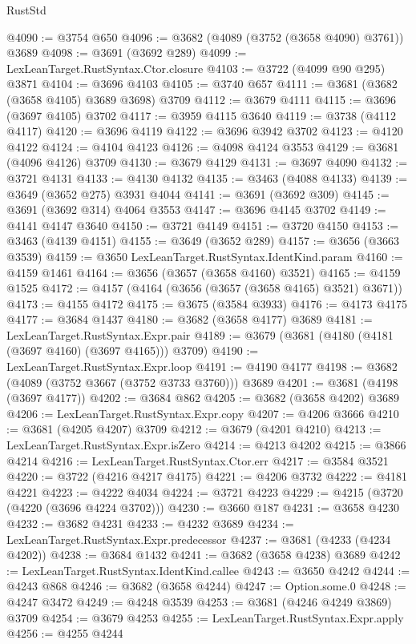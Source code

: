 \begin{lexlean}{RustStd}
\begin{coremodule}
@4090 := @3754 @650
@4096 := @3682 (@4089 (@3752 (@3658 @4090) @3761)) @3689
@4098 := @3691 (@3692 @289)
@4099 := LexLeanTarget.RustSyntax.Ctor.closure
@4103 := @3722 (@4099 @90 @295) @3871
@4104 := @3696 @4103
@4105 := @3740 @657
@4111 := @3681 (@3682 (@3658 @4105) @3689 @3698) @3709
@4112 := @3679 @4111
@4115 := @3696 (@3697 @4105) @3702
@4117 := @3959 @4115 @3640
@4119 := @3738 (@4112 @4117)
@4120 := @3696 @4119
@4122 := @3696 @3942 @3702
@4123 := @4120 @4122
@4124 := @4104 @4123
@4126 := @4098 @4124 @3553
@4129 := @3681 (@4096 @4126) @3709
@4130 := @3679 @4129
@4131 := @3697 @4090
@4132 := @3721 @4131
@4133 := @4130 @4132
@4135 := @3463 (@4088 @4133)
@4139 := @3649 (@3652 @275) @3931 @4044
@4141 := @3691 (@3692 @309)
@4145 := @3691 (@3692 @314) @4064 @3553
@4147 := @3696 @4145 @3702
@4149 := @4141 @4147 @3640
@4150 := @3721 @4149
@4151 := @3720 @4150
@4153 := @3463 (@4139 @4151)
@4155 := @3649 (@3652 @289)
@4157 := @3656 (@3663 @3539)
@4159 := @3650 LexLeanTarget.RustSyntax.IdentKind.param
@4160 := @4159 @1461
@4164 := @3656 (@3657 (@3658 @4160) @3521)
@4165 := @4159 @1525
@4172 := @4157 (@4164 (@3656 (@3657 (@3658 @4165) @3521) @3671))
@4173 := @4155 @4172
@4175 := @3675 (@3584 @3933)
@4176 := @4173 @4175
@4177 := @3684 @1437
@4180 := @3682 (@3658 @4177) @3689
@4181 := LexLeanTarget.RustSyntax.Expr.pair
@4189 := @3679 (@3681 (@4180 (@4181 (@3697 @4160) (@3697 @4165))) @3709)
@4190 := LexLeanTarget.RustSyntax.Expr.loop
@4191 := @4190 @4177
@4198 := @3682 (@4089 (@3752 @3667 (@3752 @3733 @3760))) @3689
@4201 := @3681 (@4198 (@3697 @4177))
@4202 := @3684 @862
@4205 := @3682 (@3658 @4202) @3689
@4206 := LexLeanTarget.RustSyntax.Expr.copy
@4207 := @4206 @3666
@4210 := @3681 (@4205 @4207) @3709
@4212 := @3679 (@4201 @4210)
@4213 := LexLeanTarget.RustSyntax.Expr.isZero
@4214 := @4213 @4202
@4215 := @3866 @4214
@4216 := LexLeanTarget.RustSyntax.Ctor.err
@4217 := @3584 @3521
@4220 := @3722 (@4216 @4217 @4175)
@4221 := @4206 @3732
@4222 := @4181 @4221
@4223 := @4222 @4034
@4224 := @3721 @4223
@4229 := @4215 (@3720 (@4220 (@3696 @4224 @3702)))
@4230 := @3660 @187
@4231 := @3658 @4230
@4232 := @3682 @4231
@4233 := @4232 @3689
@4234 := LexLeanTarget.RustSyntax.Expr.predecessor
@4237 := @3681 (@4233 (@4234 @4202))
@4238 := @3684 @1432
@4241 := @3682 (@3658 @4238) @3689
@4242 := LexLeanTarget.RustSyntax.IdentKind.callee
@4243 := @3650 @4242
@4244 := @4243 @868
@4246 := @3682 (@3658 @4244)
@4247 := Option.some.{0}
@4248 := @4247 @3472
@4249 := @4248 @3539
@4253 := @3681 (@4246 @4249 @3869) @3709
@4254 := @3679 @4253
@4255 := LexLeanTarget.RustSyntax.Expr.apply
@4256 := @4255 @4244

\end{coremodule}
\end{lexlean}
